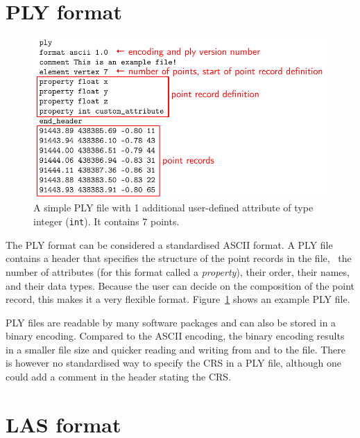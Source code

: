 %
\section{PLY format}%

\begin{figure}
  \includegraphics[width=\linewidth]{ply_header.pdf}
  \caption{A simple PLY file with 1 additional user-defined attribute of type integer (\texttt{int}). It contains 7 points.}%
\label{fig:ply}
\end{figure}
The PLY format can be considered a standardised ASCII format.
A PLY file contains a header that specifies the structure of the point records in the file, \ie\ the number of attributes (for this format called a \emph{property}), their order, their names, and their data types.
Because the user can decide on the composition of the point record, this makes it a very flexible format.
Figure~\ref{fig:ply} shows an example PLY file.

%

PLY files are readable by many software packages and can also be stored in a binary encoding.
Compared to the ASCII encoding, the binary encoding results in a smaller file size and quicker reading and writing from and to the file.
There is however no standardised way to specify the CRS in a PLY file, although one could add a comment in the header stating the CRS\@.


%
\section{LAS format}%


